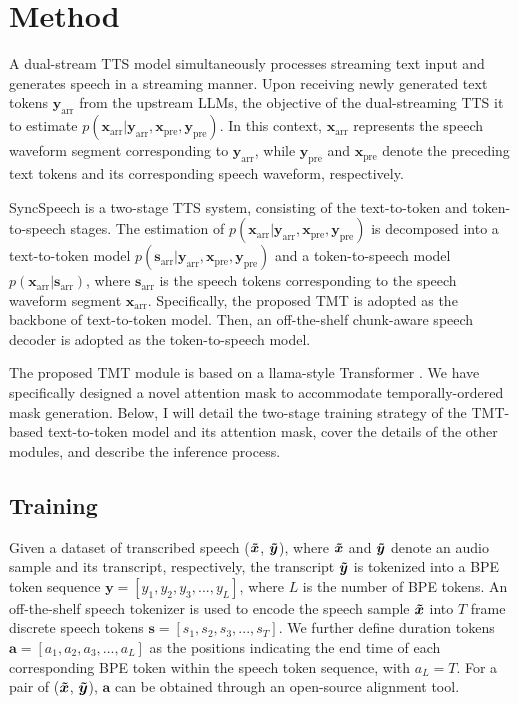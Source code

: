 
\section{Method}
A dual-stream TTS model simultaneously processes streaming text input and generates speech in a streaming manner. Upon receiving newly generated text tokens $\boldsymbol{y}_{\text{arr}}$ from the upstream LLMs, the objective of the dual-streaming TTS it to estimate $p(\boldsymbol{x}_{\text{arr}} | \boldsymbol{y}_{\text{arr}}, \boldsymbol{x}_{\text{pre}},\boldsymbol{y}_{\text{pre}})$. In this context,  $\boldsymbol{x}_{\text{arr}}$ represents the speech waveform segment corresponding to $\boldsymbol{y}_{\text{arr}}$, while   $\boldsymbol{y}_{\text{pre}}$ and $ \boldsymbol{x}_{\text{pre}}$ denote the preceding text tokens and its corresponding speech waveform, respectively.  

SyncSpeech is a two-stage TTS system, consisting of the text-to-token and token-to-speech stages. 
The estimation of $p(\boldsymbol{x}_{\text{arr}} | \boldsymbol{y}_{\text{arr}}, \boldsymbol{x}_{\text{pre}}, \boldsymbol{y}_{\text{pre}})$ is decomposed into a  text-to-token model $p(\boldsymbol{s}_{\text{arr}}| \boldsymbol{y}_{\text{arr}}, \boldsymbol{x}_{\text{pre}}, \boldsymbol{y}_{\text{pre}})$ and a token-to-speech model $p(\boldsymbol{x}_{\text{arr}} | \boldsymbol{s}_{\text{arr}})$, where $\boldsymbol{s}_{\text{arr}}$ is the speech tokens corresponding to the speech waveform segment $\boldsymbol{x}_{\text{arr}}$. Specifically,  the proposed TMT is adopted as the backbone of text-to-token model. Then, an off-the-shelf chunk-aware speech decoder \cite{cosyvoice2.0} is adopted as the  token-to-speech model. 

The proposed TMT module is based on a llama-style Transformer \cite{llama}. We have specifically designed a novel attention mask to accommodate temporally-ordered mask generation. Below, I will detail the two-stage training strategy of the TMT-based text-to-token model and its attention mask, cover the details of the other modules, and describe the inference process.

\subsection{Training}
\label{sec:training}

Given a dataset of transcribed speech ($\boldsymbol{\Tilde{x}}$, $\boldsymbol{\Tilde{y}}$), where $\boldsymbol{\Tilde{x}}$ and $\boldsymbol{\Tilde{y}}$ denote an audio sample and its transcript, respectively, the transcript $\boldsymbol{\Tilde{y}}$ is tokenized into a BPE token sequence $\boldsymbol{y} = [y_1, y_2, y_3, ..., y_L]$, where $L$ is the number of BPE tokens.  An off-the-shelf speech tokenizer is used to encode the speech sample $\boldsymbol{\Tilde{x}}$ into $T$ frame discrete speech tokens $\boldsymbol{s} = [s_1, s_2, s_3, ..., s_T]$. We further define duration tokens $\boldsymbol{a} = [a_1, a_2, a_3, ..., a_L]$ as the positions indicating the end time of each corresponding BPE token within the speech token sequence, with $a_L = T.$  For a pair of ($\boldsymbol{\Tilde{x}}$, $\boldsymbol{\Tilde{y}}$), $\boldsymbol{a}$ can be obtained through an open-source alignment tool. 

